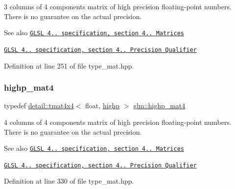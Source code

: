 3 columns of 4 components matrix of high precision floating-\/point numbers. There is no guarantee on the actual precision.

\begin{DoxySeeAlso}{See also}
\href{http://www.opengl.org/registry/doc/GLSLangSpec.4.20.8.pdf}{\tt G\+L\+SL 4.. specification, section 4.. Matrices} 

\href{http://www.opengl.org/registry/doc/GLSLangSpec.4.20.8.pdf}{\tt G\+L\+SL 4.. specification, section 4.. Precision Qualifier} 
\end{DoxySeeAlso}


Definition at line 251 of file type\+\_\+mat.\+hpp.

\mbox{\label{group__core__precision_ga3067b3b8ce793227a51b2e3c233257d5}} 
\subsubsection{\texorpdfstring{highp\+\_\+mat4}{highp\_mat4}}
{\footnotesize\ttfamily typedef \hyperlink{structglm_1_1detail_1_1tmat4x4}{detail\+::tmat4x4}$<$ float, \hyperlink{namespaceglm_a0f04f086094c747d227af4425893f545ac6f7eab42eacbb10d59a58e95e362074}{highp} $>$ \hyperlink{group__core__precision_ga3067b3b8ce793227a51b2e3c233257d5}{glm\+::highp\+\_\+mat4}}

4 columns of 4 components matrix of high precision floating-\/point numbers. There is no guarantee on the actual precision.

\begin{DoxySeeAlso}{See also}
\href{http://www.opengl.org/registry/doc/GLSLangSpec.4.20.8.pdf}{\tt G\+L\+SL 4.. specification, section 4.. Matrices} 

\href{http://www.opengl.org/registry/doc/GLSLangSpec.4.20.8.pdf}{\tt G\+L\+SL 4.. specification, section 4.. Precision Qualifier} 
\end{DoxySeeAlso}


Definition at line 330 of file type\+\_\+mat.\+hpp.

\mbox{\label{group__core__precision_gadf9c4a7947c2b0a79f52cc86a860f270}} 
